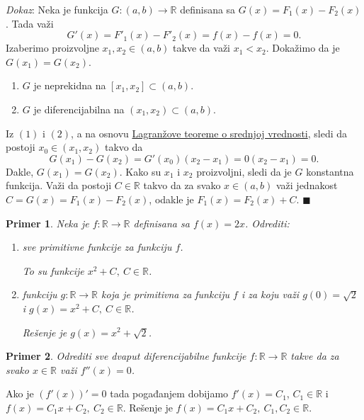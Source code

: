 \documentclass{article}
\newtheorem{prim}{Primer}[section]
\begin{document}
\textit{Dokaz}: Neka je funkcija $G:\left(a,b\right)\longrightarrow\mathbb{R}$ definisana
sa $G\left(x\right)=F_1\left(x\right)-F_2\left(x\right)$. Tada važi
$$G'\left(x\right)=F'_1\left(x\right)-F'_2\left(x\right)=f\left(x\right)-f\left(x\right)=0.$$
Izaberimo proizvoljne $x_1,x_2\in\left(a,b\right)$ takve da važi $x_1<x_2$. Dokažimo
da je $G\left(x_1\right)=G\left(x_2\right)$.
\begin{enumerate}[label=(\arabic*)]
    \item $G$ je neprekidna na $\left[x_1,x_2\right]\subset\left(a,b\right)$.
    \item $G$ je diferencijabilna na $\left(x_1,x_2\right)\subset\left(a,b\right)$.
\end{enumerate}
Iz $\left(1\right)$ i $\left(2\right)$, a na osnovu
\hyperref[podsetnik_teoreme_2]{Lagranžove teoreme o srednjoj vrednosti}, sledi da
postoji $x_0\in\left(x_1,x_2\right)$ takvo da
$$G\left(x_1\right)-G\left(x_2\right)=G'\left(x_0\right)\left(x_2-x_1\right)=0\left(x_2-x_1\right)
    =0.$$
Dakle, $G\left(x_1\right)=G\left(x_2\right)$. Kako su $x_1$ i $x_2$ proizvoljni,
sledi da je $G$ konstantna funkcija. Važi da postoji $C\in\mathbb{R}$ takvo da za
svako $x\in\left(a,b\right)$ važi jednakost
$C=G\left(x\right)=F_1\left(x\right)-F_2\left(x\right)$, odakle je
$F_1\left(x\right)=F_2\left(x\right)+C$.
\null\hfill $\blacksquare$\par

\begin{primbox}
    \label{primer_1.1}
    \begin{prim}
        Neka je $f: \mathbb{R} \longrightarrow \mathbb{R}$ definisana sa $f\left(x\right)=2x$.
        Odrediti:
        \begin{enumerate}[label=\alph*)]
            \item sve primitivne funkcije za funkciju $f$.\par
                  To su funkcije $x^2 + C,\  C \in \mathbb{R}$.
            \item funkciju $g: \mathbb{R} \longrightarrow \mathbb{R}$ koja je primitivna
                  za funkciju $f$ i za koju važi $g\left(0\right)=\sqrt{2}$ i
                  $g\left(x\right)=x^2+C,\ C\in\mathbb{R}$.\par
                  Rešenje je $g\left(x\right)=x^2+\sqrt{2}$.
        \end{enumerate}
    \end{prim}
\end{primbox}

\begin{primbox}
    \label{primer_1.2}
    \begin{prim}
        Odrediti sve dvaput diferencijabilne funkcije $f:\mathbb{R}\longrightarrow\mathbb{R}$
        takve da za svako $x\in\mathbb{R}$ važi $f''\left(x\right)=0$.
    \end{prim}
    Ako je $\left(f'\left(x\right)\right)'=0$ tada pogađanjem dobijamo $f'\left(x\right)=C_1$,
    $C_1\in\mathbb{R}$ i $f\left(x\right)=C_1x+C_2,\ C_2\in\mathbb{R}$. Rešenje je
    $f\left(x\right)=C_1x+C_2,\ C_1,C_2\in\mathbb{R}$.
\end{primbox}
\end{document}
